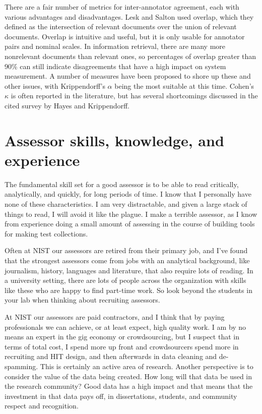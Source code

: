 \documentclass[nobib]{tufte-book}
\begin{document}
There are a fair number of metrics for inter-annotator agreement, each with various advantages and disadvantages.  Lesk and Salton used overlap, which they defined as the intersection of relevant documents over the union of relevant documents.\autocite{lesk-salton-1969} Overlap is intuitive and useful, but it is only usable for annotator pairs and nominal scales.  In information retrieval, there are many more nonrelevant documents than relevant ones, so percentages of overlap greater than 90\% can still indicate disagreements that have a high impact on system measurement.  A number of measures have been proposed to shore up these and other issues, with Krippendorff's $\alpha$ being the most suitable at this time.\autocite{hayes_answering_2007}  Cohen's $\kappa$ is often reported in the literature, but has several shortcomings discussed in the cited survey by Hayes and Krippendorff.

\section{Assessor skills, knowledge, and experience}

The fundamental skill set for a good assessor is to be able to read critically, analytically, and quickly, for long periods of time.  I know that I personally have none of these characteristics.  I am very distractable, and given a large stack of things to read, I will avoid it like the plague.  I make a terrible assessor, as I know from experience doing a small amount of assessing in the course of building tools for making test collections.

Often at NIST our assessors are retired from their primary job, and I've found that the strongest assessors come from jobs with an analytical background, like journalism, history, languages and literature, that also require lots of reading.  In a university setting, there are lots of people across the organization with skills like these who are happy to find part-time work.  So look beyond the students in your lab when thinking about recruiting assessors.

At NIST our assessors are paid contractors, and I think that by paying professionals we can achieve, or at least expect, high quality work. I am by no means an expert in the gig economy or crowdsourcing, but I suspect that in terms of total cost, I spend more up front and crowdsourcers spend more in recruiting and HIT design, and then afterwards in data cleaning and de-spamming.  This is certainly an active area of research.  Another perspective is to consider the value of the data being created.  How long will that data be used in the research community?  Good data has a high impact and that means that the investment in that data pays off, in dissertations, students, and community respect and recognition.
\end{document}
